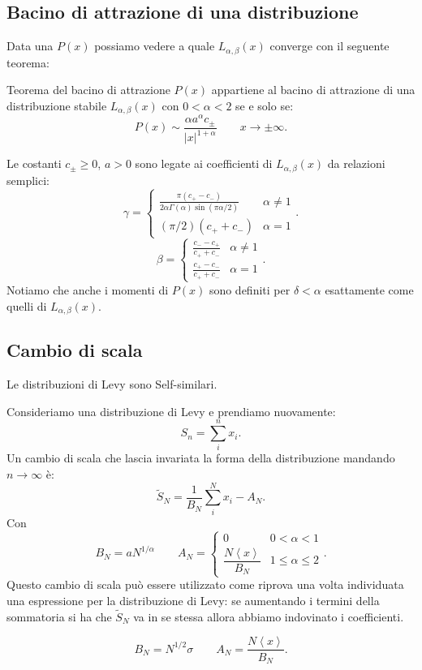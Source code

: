 \subsection{Bacino di attrazione di una distribuzione}%
\label{sub:Bacino di attrazione di una distribuzione}
Data una $P(x) $ possiamo vedere a quale $L_{\alpha,\beta  }(x)$ converge con il seguente teorema:
\begin{greenbox}{Teorema del bacino di attrazione}
    $P(x)$ appartiene al bacino di attrazione di una distribuzione stabile $L_{\alpha,\beta  }(x)$ con $0<\alpha <2$ se e solo se:
    \[
	P(x) \sim \frac{\alpha a^\alpha c_{\pm}}{\left|x\right|^{1+\alpha}} \qquad  x\to \pm\infty
    .\] 
\end{greenbox}
\noindent
Le costanti $c_{\pm}\ge 0$, $a>0$ sono legate ai coefficienti di $L_{\alpha,\beta  }(x)$ da relazioni semplici:
\[
    \gamma  = 
    \begin{cases}
	\frac{\pi\left(c_+-c_-\right)}{2\alpha\Gamma(\alpha) \sin (\pi\alpha  /2) } & \alpha\neq 1 \\
	(\pi / 2) (c_+ + c_-) & \alpha  = 1
    \end{cases}
.\] 
\[
    \beta  = 
    \begin{cases}
	\frac{c_- - c_+}{c_+ + c_-} & \alpha  \neq 1 \\
	\frac{c_+ - c_-}{c_+ + c_-} & \alpha  = 1
    \end{cases}
.\] 
Notiamo che anche i momenti di $P(x)$ sono definiti per $\delta <\alpha$ esattamente come quelli di $L_{\alpha,\beta  }(x)$.  
\subsection{Cambio di scala}%
\label{sub:Cambio di scala}
\begin{redbox}{}
    Le distribuzioni di Levy sono Self-similari.
\end{redbox}
\noindent
Consideriamo una distribuzione di Levy e prendiamo nuovamente:
\[
    S_n = \sum_{i}^{n} x_i
.\] 
Un cambio di scala che lascia invariata la forma della distribuzione mandando $n\to \infty$ è:
\[
    \tilde{S}_N = \frac{1}{B_N}\sum_{i}^{N}x_i - A_N	
.\] 
Con
\[
    B_N = aN^{1 /\alpha} \qquad 
    A_N = 
    \begin{cases}
	0 & 0<\alpha <1\\
	\dfrac{N\left<x\right>}{B_N} & 1 \le \alpha\le 2
    \end{cases}
.\] 
Questo cambio di scala può essere utilizzato come riprova una volta individuata una espressione per la distribuzione di Levy: 
se aumentando i termini della sommatoria si ha che $\tilde{S}_N$ va in se stessa allora abbiamo indovinato i coefficienti.
\begin{exmp}[Gaussiana]
    \[
        B_N = N^{1 /2}\sigma \qquad A_N = \frac{N\left<x\right>}{B_N} 
    .\] 
\end{exmp}
\noindent
